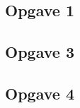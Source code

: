 \subsection{Opgave 1}

\begin{landscape}
\subsection{Opgave 3}

\end{landscape}
\subsection{Opgave 4}

